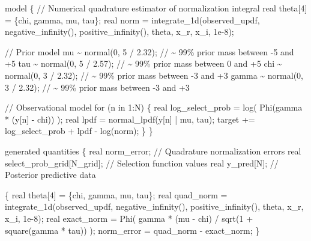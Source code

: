 \documentclass[
  letterpaper,
  DIV=11,
  numbers=noendperiod]{scrartcl}
\newenvironment{Shaded}{\begin{snugshade}}{\end{snugshade}}
\newcommand{\CommentTok}[1]{\textcolor[rgb]{0.37,0.37,0.37}{#1}}
\newcommand{\ControlFlowTok}[1]{\textcolor[rgb]{0.00,0.23,0.31}{#1}}
\newcommand{\DataTypeTok}[1]{\textcolor[rgb]{0.68,0.00,0.00}{#1}}
\newcommand{\DecValTok}[1]{\textcolor[rgb]{0.68,0.00,0.00}{#1}}
\newcommand{\FloatTok}[1]{\textcolor[rgb]{0.68,0.00,0.00}{#1}}
\newcommand{\KeywordTok}[1]{\textcolor[rgb]{0.00,0.23,0.31}{#1}}
\newcommand{\NormalTok}[1]{\textcolor[rgb]{0.00,0.23,0.31}{#1}}
\begin{document}
\begin{codelisting}
\begin{Shaded}
\begin{Highlighting}[]
\KeywordTok{model}\NormalTok{ \{}
  \CommentTok{// Numerical quadrature estimator of normalization integral}
  \DataTypeTok{real}\NormalTok{ theta[}\DecValTok{4}\NormalTok{] = \{chi, gamma, mu, tau\};}
  \DataTypeTok{real}\NormalTok{ norm = integrate\_1d(observed\_updf,}
\NormalTok{                           negative\_infinity(), positive\_infinity(),}
\NormalTok{                           theta, x\_r, x\_i, }\FloatTok{1e{-}8}\NormalTok{);}
  
  \CommentTok{// Prior model}
\NormalTok{  mu \textasciitilde{} normal(}\DecValTok{0}\NormalTok{, }\DecValTok{5}\NormalTok{ / }\FloatTok{2.32}\NormalTok{);   }\CommentTok{// \textasciitilde{} 99\% prior mass between {-}5 and +5}
\NormalTok{  tau \textasciitilde{} normal(}\DecValTok{0}\NormalTok{, }\DecValTok{5}\NormalTok{ / }\FloatTok{2.57}\NormalTok{);  }\CommentTok{// \textasciitilde{} 99\% prior mass between 0 and +5}
\NormalTok{  chi \textasciitilde{} normal(}\DecValTok{0}\NormalTok{, }\DecValTok{3}\NormalTok{ / }\FloatTok{2.32}\NormalTok{);   }\CommentTok{// \textasciitilde{} 99\% prior mass between {-}3 and +3}
\NormalTok{  gamma \textasciitilde{} normal(}\DecValTok{0}\NormalTok{, }\DecValTok{3}\NormalTok{ / }\FloatTok{2.32}\NormalTok{); }\CommentTok{// \textasciitilde{} 99\% prior mass between {-}3 and +3}
  
  \CommentTok{// Observational model}
  \ControlFlowTok{for}\NormalTok{ (n }\ControlFlowTok{in} \DecValTok{1}\NormalTok{:N) \{}
    \DataTypeTok{real}\NormalTok{ log\_select\_prob = log( Phi(gamma * (y[n] {-} chi)) );}
    \DataTypeTok{real}\NormalTok{ lpdf = normal\_lpdf(y[n] | mu, tau);}
    \KeywordTok{target +=}\NormalTok{ log\_select\_prob + lpdf {-} log(norm);}
\NormalTok{  \}}
\NormalTok{\}}

\KeywordTok{generated quantities}\NormalTok{ \{}
  \DataTypeTok{real}\NormalTok{ norm\_error;               }\CommentTok{// Quadrature normalization errors}
  \DataTypeTok{real}\NormalTok{ select\_prob\_grid[N\_grid]; }\CommentTok{// Selection function values}
  \DataTypeTok{real}\NormalTok{ y\_pred[N];                }\CommentTok{// Posterior predictive data}

\NormalTok{  \{}
    \DataTypeTok{real}\NormalTok{ theta[}\DecValTok{4}\NormalTok{] = \{chi, gamma, mu, tau\};}
    \DataTypeTok{real}\NormalTok{ quad\_norm = integrate\_1d(observed\_updf,}
\NormalTok{                                  negative\_infinity(), }
\NormalTok{                                  positive\_infinity(),}
\NormalTok{                                  theta, x\_r, x\_i, }\FloatTok{1e{-}8}\NormalTok{);}
    \DataTypeTok{real}\NormalTok{ exact\_norm = Phi(  gamma * (mu {-} chi) }
\NormalTok{                          / sqrt(}\DecValTok{1}\NormalTok{ + square(gamma * tau)) );}
\NormalTok{    norm\_error = quad\_norm {-} exact\_norm;}
\NormalTok{  \}}
  

\end{Highlighting}
\end{Shaded}
\end{codelisting}
\end{document}
